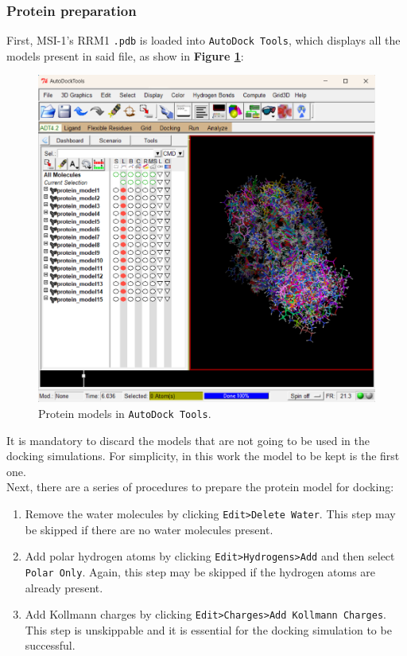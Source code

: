 \subsubsection{Protein preparation}

First, MSI-1's RRM1 \texttt{.pdb} is loaded into \texttt{AutoDock Tools}, which displays all the models present in said file, as show in \textbf{Figure \ref{fig:autodockprotein}}:

\begin{figure}[htbp!]
    \centering
    \includegraphics[width=0.8\linewidth]{assets/AutoDockTools_load_protein.png}
    \caption{Protein models in \texttt{AutoDock Tools}.}
    \label{fig:autodockprotein}
\end{figure}

It is mandatory to discard the models that are not going to be used in the docking simulations. For simplicity, in this work the model to be kept is the first one.\\

Next, there are a series of procedures to prepare the protein model for docking:

\begin{enumerate}
    \item Remove the water molecules by clicking \texttt{Edit>Delete Water}. This step may be skipped if there are no water molecules present.
    \item Add polar hydrogen atoms by clicking \texttt{Edit>Hydrogens>Add} and then select \texttt{Polar Only}. Again, this step may be skipped if the hydrogen atoms are already present.
    \item Add Kollmann charges by clicking \texttt{Edit>Charges>Add Kollmann Charges}. This step is unskippable and it is essential for the docking simulation to be successful.
\end{enumerate}

